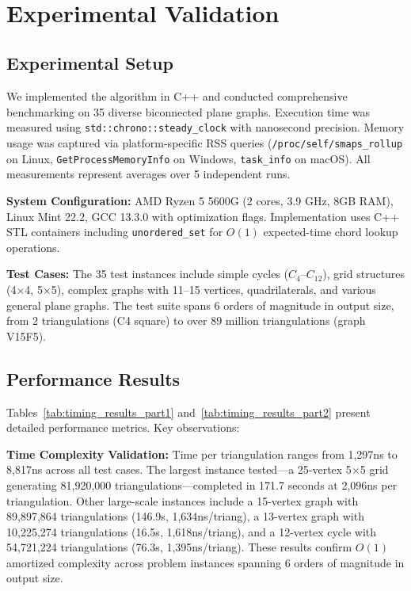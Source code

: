 ﻿﻿\documentclass[12pt,a4paper]{article}
\theoremstyle{definition}
\theoremstyle{remark}
\begin{document}
\section{Experimental Validation}
\label{sec:experiments}

\subsection{Experimental Setup}

We implemented the algorithm in C++ and conducted comprehensive benchmarking on 35 diverse biconnected plane graphs. Execution time was measured using \texttt{std::chrono::steady\_clock} with nanosecond precision. Memory usage was captured via platform-specific RSS queries (\texttt{/proc/self/smaps\_rollup} on Linux, \texttt{GetProcessMemoryInfo} on Windows, \texttt{task\_info} on macOS). All measurements represent averages over 5 independent runs.

\textbf{System Configuration:} AMD Ryzen 5 5600G (2 cores, 3.9 GHz, 8GB RAM), Linux Mint 22.2, GCC 13.3.0 with optimization flags. Implementation uses C++ STL containers including \texttt{unordered\_set} for $O(1)$ expected-time chord lookup operations.

\textbf{Test Cases:} The 35 test instances include simple cycles ($C_4$--$C_{12}$), grid structures (4$\times$4, 5$\times$5), complex graphs with 11--15 vertices, quadrilaterals, and various general plane graphs. The test suite spans 6 orders of magnitude in output size, from 2 triangulations (C4 square) to over 89 million triangulations (graph V15F5).
\subsection{Performance Results}

Tables~\ref{tab:timing_results_part1} and~\ref{tab:timing_results_part2} present detailed performance metrics. Key observations:

\textbf{Time Complexity Validation:} Time per triangulation ranges from 1,297ns to 8,817ns across all test cases. The largest instance tested---a 25-vertex 5$\times$5 grid generating 81,920,000 triangulations---completed in 171.7 seconds at 2,096ns per triangulation. Other large-scale instances include a 15-vertex graph with 89,897,864 triangulations (146.9s, 1,634ns/triang), a 13-vertex graph with 10,225,274 triangulations (16.5s, 1,618ns/triang), and a 12-vertex cycle with 54,721,224 triangulations (76.3s, 1,395ns/triang). These results confirm $O(1)$ amortized complexity across problem instances spanning 6 orders of magnitude in output size.
\end{document}
